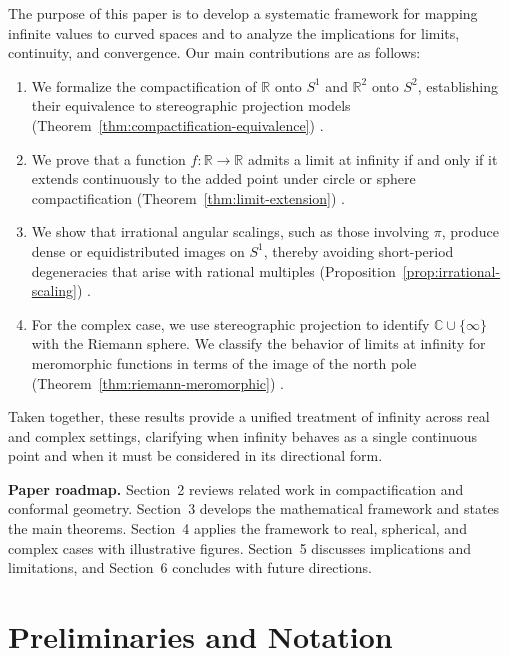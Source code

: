\documentclass[12pt]{article}
\theoremstyle{remark}
\begin{document}
The purpose of this paper is to develop a systematic framework for mapping 
infinite values to curved spaces and to analyze the implications for limits, 
continuity, and convergence. Our main contributions are as follows:  

\begin{enumerate}
    \item We formalize the compactification of $\mathbb{R}$ onto $S^1$ and 
    $\mathbb{R}^2$ onto $S^2$, establishing their equivalence to stereographic 
    projection models (Theorem~\ref{thm:compactification-equivalence}) 
    \citep{MunkresTopology,AhlforsComplex}.  
    \item We prove that a function $f : \mathbb{R} \to \mathbb{R}$ admits a limit 
    at infinity if and only if it extends continuously to the added point under 
    circle or sphere compactification (Theorem~\ref{thm:limit-extension}) 
    \citep{MunkresTopology,WillardGT}.  
    \item We show that irrational angular scalings, such as those involving $\pi$, 
    produce dense or equidistributed images on $S^1$, thereby avoiding 
    short-period degeneracies that arise with rational multiples 
    (Proposition~\ref{prop:irrational-scaling}) 
    \citep{Weyl1916,KuipersNiederreiterUD,WaltersErgodic}.  
    \item For the complex case, we use stereographic projection to identify 
    $\mathbb{C} \cup \{\infty\}$ with the Riemann sphere. We classify the behavior 
    of limits at infinity for meromorphic functions in terms of the image of the 
    north pole (Theorem~\ref{thm:riemann-meromorphic}) 
    \citep{AhlforsComplex}.  
\end{enumerate}

Taken together, these results provide a unified treatment of infinity across real 
and complex settings, clarifying when infinity behaves as a single continuous 
point and when it must be considered in its directional form.  

\textbf{Paper roadmap.} Section~2 reviews related work in compactification and 
conformal geometry. Section~3 develops the mathematical framework and states the 
main theorems. Section~4 applies the framework to real, spherical, and complex 
cases with illustrative figures. Section~5 discusses implications and limitations, 
and Section~6 concludes with future directions.  

\section{Preliminaries and Notation}
\label{sec:preliminaries}
\end{document}
